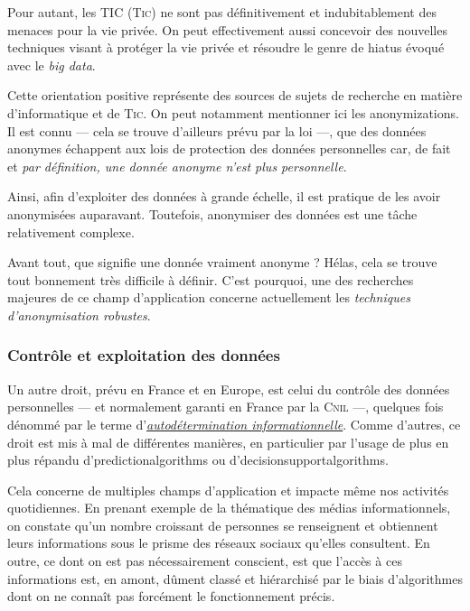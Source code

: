 Pour autant, les \gls{TIC} (\textsc{Tic}) ne sont pas définitivement et indubitablement des menaces pour la vie privée. On peut effectivement aussi concevoir des nouvelles techniques visant à protéger la vie privée et résoudre le genre de hiatus évoqué avec le \textit{big data}.

Cette orientation positive représente des sources de sujets de recherche en matière d'informatique et de \textsc{Tic}. On peut notamment mentionner ici les \glspl{anonymization}. Il est connu --- cela se trouve d'ailleurs prévu par la loi ---, que des données anonymes échappent aux lois de protection des données personnelles car, de fait et \emph{par définition, une donnée anonyme n'est plus personnelle}.

Ainsi, afin d'exploiter des données à grande échelle, il est pratique de les avoir anonymisées auparavant. Toutefois, anonymiser des données est une tâche relativement complexe.

Avant tout, que signifie une donnée vraiment anonyme ? Hélas, cela se trouve tout bonnement très difficile à définir. 
C'est pourquoi, une des recherches majeures de ce champ d'application concerne actuellement les \emph{techniques d'anonymisation robustes}.  


\subsubsection[Contrôle et exploitation]{Contrôle et exploitation des données}
\label{subsub:I.4.1.2}

Un autre droit, prévu en France et en Europe, est celui du contrôle des données personnelles --- et normalement garanti en France par la \textsc{Cnil} ---, quelques fois dénommé par le terme d'\href{https://www.cnil.fr/fr/ce-que-change-la-loi-pour-une-republique-numerique-pour-la-protection-des-donnees-personnelles}{\emph{autodétermination informationnelle}}. Comme d'autres, ce droit est mis à mal de différentes manières, en particulier par l'usage de plus en plus répandu d'\glspl{predictionalgorithm} ou d'\glspl{decisionsupportalgorithm}. 

Cela concerne de multiples champs d'application et impacte même nos activités quotidiennes. En prenant exemple de la thématique des médias informationnels, on constate qu'un nombre croissant de personnes se renseignent et obtiennent leurs informations sous le prisme des réseaux sociaux qu'elles consultent. En outre, ce dont on est pas nécessairement conscient, est que l'accès à ces informations est, en amont, dûment classé et hiérarchisé par le biais d'algorithmes dont on ne connaît pas forcément le fonctionnement précis.

